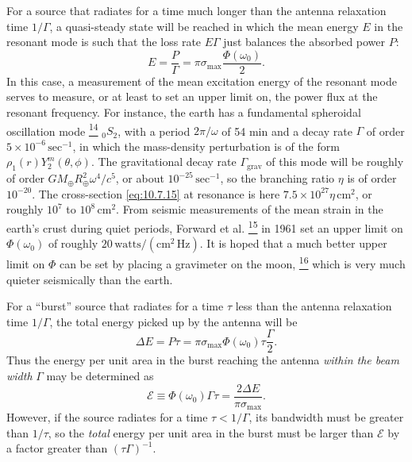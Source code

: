 For a source that radiates for a time much longer than the antenna relaxation
time \(1/\Gamma\), a quasi-steady state will be reached in which the mean
energy \(E\) in the resonant mode is such that the loss rate \(E\Gamma\) just
balances the absorbed power \(P\):
\begin{equation}
  E
  =
  \frac{P}{\Gamma}
  =
  \pi\sigma_{\max}\frac{\Phi(\omega_0)}{2}.
  \tag{10.7.18}\label{eq:10.7.18}
\end{equation}
In this case, a measurement of the mean excitation energy of the resonant mode
serves to measure, or at least to set an upper limit on, the power flux at the
resonant frequency. For instance, the earth has a fundamental spheroidal
oscillation mode%
\hyperref[ch10-ref-14]{\textsuperscript{14}}
\({}_0S_2\), with a period \(2\pi/\omega\) of 54 min and a decay rate
\(\Gamma\) of order \(5\times10^{-6}\,\mathrm{sec^{-1}}\), in which the
mass-density perturbation is of the form
\(\rho_1(r)Y_2^m(\theta,\phi)\). The gravitational decay rate
\(\Gamma_{\mathrm{grav}}\) of this mode will be roughly of order
\(GM_\oplus R_\oplus^2\omega^4/c^5\), or about
\(10^{-25}\,\mathrm{sec^{-1}}\), so the branching ratio \(\eta\) is of
order \(10^{-20}\). The cross-section \eqref{eq:10.7.15} at resonance is
here \(7.5\times10^{27}\eta\,\mathrm{cm^2}\), or roughly
\(10^7\) to \(10^8\,\mathrm{cm^2}\). From seismic measurements of the
mean strain in the earth's crust during quiet periods, Forward et al.%
\hyperref[ch10-ref-15]{\textsuperscript{15}}
in 1961 set an upper limit on \(\Phi(\omega_0)\) of roughly
\(20\,\mathrm{watts/(cm^2\,Hz)}\). It is hoped that a much better upper
limit on \(\Phi\) can be set by placing a gravimeter on the moon,%
\hyperref[ch10-ref-16]{\textsuperscript{16}}
which is very much quieter seismically than the earth.

For a ``burst'' source that radiates for a time \(\tau\) less than the antenna
relaxation time \(1/\Gamma\), the total energy picked up by the antenna will
be
\[
  \Delta E
  =
  P\tau
  =
  \pi\sigma_{\max}\Phi(\omega_0)\tau\frac{\Gamma}{2}.
\]
Thus the energy per unit area in the burst reaching the antenna
\emph{within the beam width} \(\Gamma\) may be determined as
\begin{equation}
  \mathcal{E}
  \equiv
  \Phi(\omega_0)\Gamma\tau
  =
  \frac{2\Delta E}{\pi\sigma_{\max}}.
  \tag{10.7.19}\label{eq:10.7.19}
\end{equation}
However, if the source radiates for a time \(\tau<1/\Gamma\), its bandwidth
must be greater than \(1/\tau\), so the \emph{total} energy per unit area in
the burst must be larger than \(\mathcal{E}\) by a factor greater than
\((\tau\Gamma)^{-1}\).


